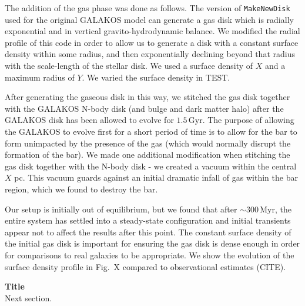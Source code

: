 \documentclass{natureprintstyle}
\begin{document}
The addition of the gas phase was done as follows. The version of
\texttt{MakeNewDisk} used for the original GALAKOS model can generate a gas
disk which is radially exponential and in vertical gravito-hydrodynamic
balance. We modified the radial profile of this code in order to allow us to
generate a disk with a constant surface density within some radius, and then
exponentially declining beyond that radius with the scale-length of the
stellar disk. We used a surface density of $X$ and a maximum radius of $Y$. We
varied the surface density in TEST.

After generating the gaseous disk in this way, we stitched the gas disk
together with the GALAKOS N-body disk (and bulge and dark matter halo) after
the GALAKOS disk has been allowed to evolve for $1.5\,\textrm{Gyr}$. The
purpose of allowing the GALAKOS to evolve first for a short period of time is
to allow for the bar to form unimpacted by the presence of the gas (which
would normally disrupt the formation of the bar). We made one additional
modification when stitching the gas disk together with the N-body disk - we
created a vacuum within the central $X$ pc. This vacuum guards against an
initial dramatic infall of gas within the bar region, which we found to
destroy the bar.

Our setup is initially out of equilibrium, but we found that after
$\sim300\,\textrm{Myr}$, the entire system has settled into a steady-state
configuration and initial transients appear not to affect the results after
this point. The constant surface density of the initial gas disk is important
for ensuring the gas disk is dense enough in order for comparisons to real
galaxies to be appropriate. We show the evolution of the surface density
profile in Fig.~X compared to observational estimates (CITE).

\vspace{12pt}

\noindent
{\bf Title}
\\
\noindent
Next section.

\end{document}
